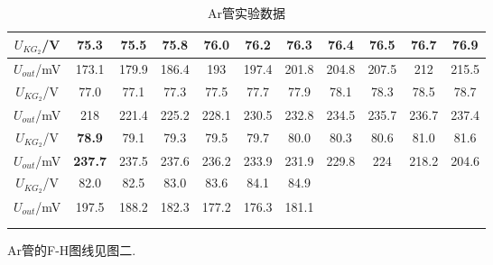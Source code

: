 \documentclass[a4paper,10pt,notitlepage]{article}
\begin{document}
\begin{center}
\begin{longtable}{|c|c|c|c|c|c|c|c|c|c|c|}
	$U_{KG_2}$/V & 75.3 & 75.5 & 75.8 & 76.0 & 76.2 & 76.3 & 76.4 & 76.5 & 76.7 & 76.9 \\
	\hline
	$U_{out}$/mV & 173.1 & 179.9 & 186.4 & 193 & 197.4 & 201.8 & 204.8 & 207.5 & 212 & 215.5 \\
	\hline
	\hline
	$U_{KG_2}$/V & 77.0 & 77.1 & 77.3 & 77.5 & 77.7 & 77.9 & 78.1 & 78.3 & 78.5 & 78.7 \\
	\hline
	$U_{out}$/mV & 218 & 221.4 & 225.2 & 228.1 & 230.5 & 232.8 & 234.5 & 235.7 & 236.7 & 237.4 \\
	\hline
	\hline
	$U_{KG_2}$/V & \textbf{78.9} & 79.1 & 79.3 & 79.5 & 79.7 & 80.0 & 80.3 & 80.6 & 81.0 & 81.6 \\
	\hline
	$U_{out}$/mV & \textbf{237.7} & 237.5 & 237.6 & 236.2 & 233.9 & 231.9 & 229.8 & 224 & 218.2 & 204.6 \\
	\hline
	\hline
	$U_{KG_2}$/V & 82.0 & 82.5 & 83.0 & 83.6 & 84.1 & 84.9 & &&& \\
	\hline
	$U_{out}$/mV & 197.5 & 188.2 & 182.3 & 177.2 & 176.3 & 181.1 & &&& \\
	\hline
	\multicolumn{1}{c}{ } \\
	\caption{Ar管实验数据}
	\end{longtable}

\end{center}

	Ar管的F-H图线见图二.
\end{document}
